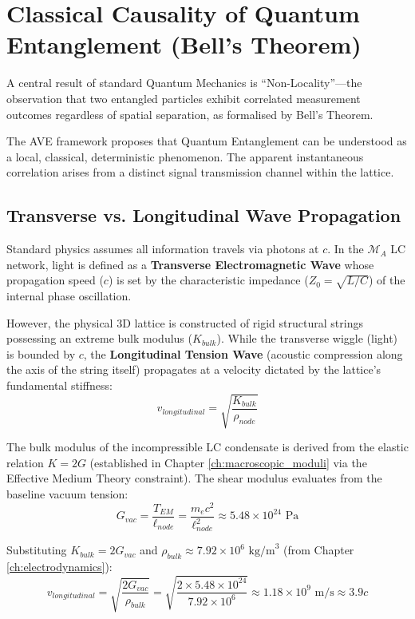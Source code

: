 \section{Classical Causality of Quantum Entanglement (Bell's Theorem)}
A central result of standard Quantum Mechanics is ``Non-Locality''---the observation that two entangled particles exhibit correlated measurement outcomes regardless of spatial separation, as formalised by Bell's Theorem.

The AVE framework proposes that Quantum Entanglement can be understood as a local, classical, deterministic phenomenon. The apparent instantaneous correlation arises from a distinct signal transmission channel within the lattice.

\subsection{Transverse vs. Longitudinal Wave Propagation}
Standard physics assumes all information travels via photons at $c$. In the $\mathcal{M}_A$ LC network, light is defined as a \textbf{Transverse Electromagnetic Wave} whose propagation speed ($c$) is set by the characteristic impedance ($Z_0 = \sqrt{L/C}$) of the internal phase oscillation. 

However, the physical 3D lattice is constructed of rigid structural strings possessing an extreme bulk modulus ($K_{bulk}$). While the transverse wiggle (light) is bounded by $c$, the \textbf{Longitudinal Tension Wave} (acoustic compression along the axis of the string itself) propagates at a velocity dictated by the lattice's fundamental stiffness:
\begin{equation}
    v_{longitudinal} = \sqrt{\frac{K_{bulk}}{\rho_{node}}}
\end{equation}

The bulk modulus of the incompressible LC condensate is derived from the elastic relation $K = 2G$ (established in Chapter \ref{ch:macroscopic_moduli} via the Effective Medium Theory constraint). The shear modulus evaluates from the baseline vacuum tension:
\begin{equation}
    G_{vac} = \frac{T_{EM}}{\ell_{node}} = \frac{m_e c^2}{\ell_{node}^2} \approx 5.48 \times 10^{24} \text{ Pa}
\end{equation}

Substituting $K_{bulk} = 2G_{vac}$ and $\rho_{bulk} \approx 7.92 \times 10^6 \text{ kg/m}^3$ (from Chapter \ref{ch:electrodynamics}):
\begin{equation}
    v_{longitudinal} = \sqrt{\frac{2G_{vac}}{\rho_{bulk}}} = \sqrt{\frac{2 \times 5.48 \times 10^{24}}{7.92 \times 10^6}} \approx 1.18 \times 10^{9} \text{ m/s} \approx 3.9c
\end{equation}

